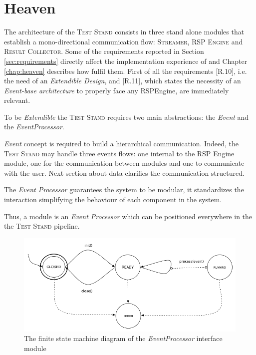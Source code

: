 \section{Heaven}\label{sec:impl-intro}

The architecture of the \textsc{Test Stand} consists in three stand alone modules that establish a mono-directional communication flow: \textsc{Streamer}, \textsc{RSP Engine} and \textsc{Result Collector}. Some of the requirements reported in Section \ref{sec:requirements} directly affect the implementation experience of \name and Chapter \ref{chap:heaven} describes how fulfil them. First of all the requirements [R.10], i.e. the need of an \textit{Extendible Design}, and [R.11], which states the necessity of an \textit{Event-base architecture} to properly face any RSPEngine, are immediately relevant. 

To be \textit{Extendible} the \textsc{Test Stand} requires two main abstractions: the \textit{Event} and the \textit{EventProcessor}.

\textit{Event} concept is required to build a hierarchical communication. Indeed, the \textsc{Test Stand} may handle three events flows: one internal to the RSP Engine module, one for the communication between modules and one to communicate with the user. Next section about data clarifies the communication structured. 

The \textit{Event Processor} guarantees the system to be modular, it standardizes the interaction simplifying the behaviour of each component in the system. 

Thus, a module is an \textit{Event Processor} which can be positioned everywhere in the the \textsc{Test Stand} pipeline. %

\begin{figure}[tbh]
  \centering
	\includegraphics[width=\linewidth]{images/fsm-schema}
	\caption[\textit{EventProcessor} States Diagram]{The finite state machine diagram of the \textit{EventProcessor} interface module}
  	\label{fig:module-fsm}
\end{figure}

